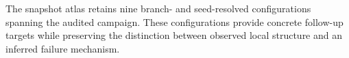 The snapshot atlas retains nine branch- and seed-resolved configurations spanning the audited campaign. These configurations provide concrete follow-up targets while preserving the distinction between observed local structure and an inferred failure mechanism.
